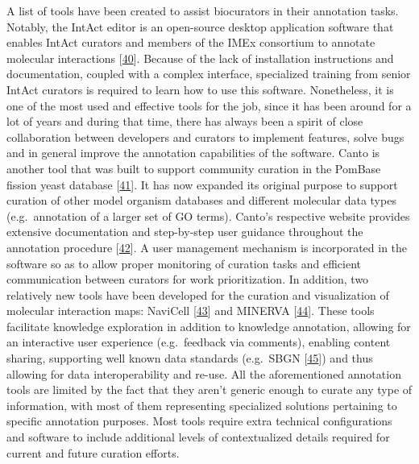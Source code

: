 \documentclass[
  12pt,
]{book}
\begin{document}
\vspace{15pt}

A list of tools have been created to assist biocurators in their annotation tasks.
Notably, the IntAct editor is an open-source desktop application software that enables IntAct curators and members of the IMEx consortium to annotate molecular interactions {[}\protect\hyperlink{ref-intact-editor}{40}{]}.
Because of the lack of installation instructions and documentation, coupled with a complex interface, specialized training from senior IntAct curators is required to learn how to use this software.
Nonetheless, it is one of the most used and effective tools for the job, since it has been around for a lot of years and during that time, there has always been a spirit of close collaboration between developers and curators to implement features, solve bugs and in general improve the annotation capabilities of the software.
Canto is another tool that was built to support community curation in the PomBase fission yeast database {[}\protect\hyperlink{ref-Rutherford2014}{41}{]}.
It has now expanded its original purpose to support curation of other model organism databases and different molecular data types (e.g.~annotation of a larger set of GO terms).
Canto's respective website provides extensive documentation and step-by-step user guidance throughout the annotation procedure {[}\protect\hyperlink{ref-canto-doc}{42}{]}.
A user management mechanism is incorporated in the software so as to allow proper monitoring of curation tasks and efficient communication between curators for work prioritization.
In addition, two relatively new tools have been developed for the curation and visualization of molecular interaction maps: NaviCell {[}\protect\hyperlink{ref-Kuperstein2013}{43}{]} and MINERVA {[}\protect\hyperlink{ref-Gawron2016}{44}{]}.
These tools facilitate knowledge exploration in addition to knowledge annotation, allowing for an interactive user experience (e.g.~feedback via comments), enabling content sharing, supporting well known data standards (e.g.~SBGN {[}\protect\hyperlink{ref-Novere2009}{45}{]}) and thus allowing for data interoperability and re-use.
All the aforementioned annotation tools are limited by the fact that they aren't generic enough to curate any type of information, with most of them representing specialized solutions pertaining to specific annotation purposes.
Most tools require extra technical configurations and software to include additional levels of contextualized details required for current and future curation efforts.
\end{document}
